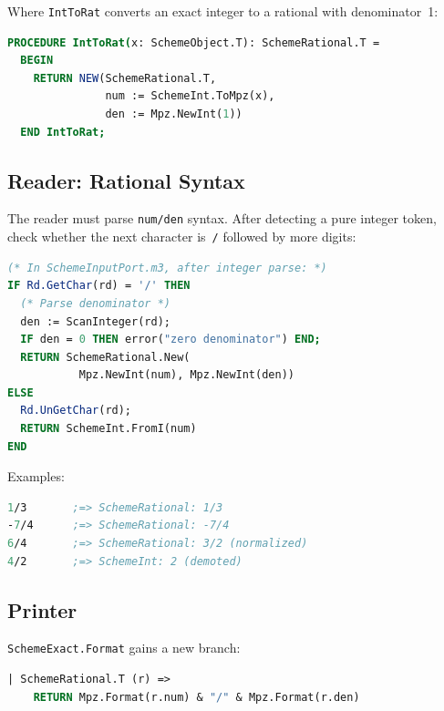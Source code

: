 \documentclass[12pt]{article}
\begin{document}
\noindent Where {\tt IntToRat} converts an exact integer to a
rational with denominator~1:
\begin{lstlisting}[language=Modula3]
PROCEDURE IntToRat(x: SchemeObject.T): SchemeRational.T =
  BEGIN
    RETURN NEW(SchemeRational.T,
               num := SchemeInt.ToMpz(x),
               den := Mpz.NewInt(1))
  END IntToRat;
\end{lstlisting}

\subsection{Reader: Rational Syntax}
\label{sec:reader-rational}

The reader must parse {\tt num/den} syntax.  After detecting a
pure integer token, check whether the next character is~{\tt /}
followed by more digits:

\begin{lstlisting}[language=Modula3]
(* In SchemeInputPort.m3, after integer parse: *)
IF Rd.GetChar(rd) = '/' THEN
  (* Parse denominator *)
  den := ScanInteger(rd);
  IF den = 0 THEN error("zero denominator") END;
  RETURN SchemeRational.New(
           Mpz.NewInt(num), Mpz.NewInt(den))
ELSE
  Rd.UnGetChar(rd);
  RETURN SchemeInt.FromI(num)
END
\end{lstlisting}

\noindent Examples:
\begin{lstlisting}[language=Scheme]
1/3       ;=> SchemeRational: 1/3
-7/4      ;=> SchemeRational: -7/4
6/4       ;=> SchemeRational: 3/2 (normalized)
4/2       ;=> SchemeInt: 2 (demoted)
\end{lstlisting}

\subsection{Printer}

{\tt SchemeExact.Format} gains a new branch:

\begin{lstlisting}[language=Modula3]
| SchemeRational.T (r) =>
    RETURN Mpz.Format(r.num) & "/" & Mpz.Format(r.den)
\end{lstlisting}
\end{document}
